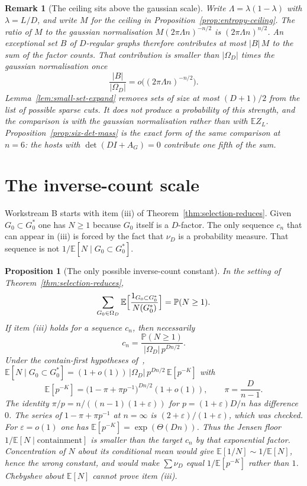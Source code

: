\documentclass[11pt]{article}
\newtheorem{proposition}[theorem]{Proposition}
\newtheorem{remark}[theorem]{Remark}
\newcommand{\EE}{\mathbb{E}}
\newcommand{\PP}{\mathbb{P}}
\begin{document}
\begin{remark}[The ceiling sits above the gaussian scale]
\label{rem:ceiling-gaussian}
Write \(\Lambda=\lambda(1-\lambda)\) with \(\lambda=L/D\), and write \(M\) for the
ceiling in Proposition~\ref{prop:entropy-ceiling}.
The ratio of \(M\) to the gaussian normalisation \(M(2\pi\Lambda n)^{-n/2}\) is
\((2\pi\Lambda n)^{n/2}\).
An exceptional set \(B\) of \(D\)-regular graphs therefore contributes at most
\(|B|\,M\) to the sum of the factor counts.
That contribution is smaller than \(|\Omega_D|\) times the gaussian
normalisation once
\[
\frac{|B|}{|\Omega_D|}
=
o\bigl((2\pi\Lambda n)^{-n/2}\bigr).
\]
Lemma~\ref{lem:small-set-expand} removes sets of size at most \((D+1)/2\) from
the list of possible sparse cuts.
It does not produce a probability of this strength, and the comparison is with
the gaussian normalisation rather than with \(\EE Z_L\).
Proposition~\ref{prop:six-det-mass} is the exact form of the same comparison
at \(n=6\): the hosts with \(\det(DI+A_G)=0\) contribute one fifth of the sum.
\end{remark}

\section{The inverse-count scale}
\label{sec:inverse-scale}

Workstream B starts with item (iii) of Theorem~\ref{thm:selection-reduces}.
Given \(G_0\subset G^*_0\) one has \(N\ge 1\) because \(G_0\) itself is a
\(D\)-factor.
The only sequence \(c_n\) that can appear in (iii) is forced by the fact
that \(\nu_D\) is a probability measure.
That sequence is not \(1/\EE[N\mid G_0\subset G^*_0]\).

\begin{proposition}[The only possible inverse-count constant]
\label{prop:target-cn}
In the setting of Theorem~\ref{thm:selection-reduces},
\[
\sum_{G_0\in\Omega_D}\EE\Bigl[\frac{1_{G_0\subset G^*_0}}{N(G^*_0)}\Bigr]
=
\PP(N\ge 1).
\]
If item (iii) holds for a sequence \(c_n\), then necessarily
\[
c_n
=
\frac{\PP(N\ge 1)}{\lvert\Omega_D\rvert\,p^{Dn/2}}.
\]
Under the contain-first hypotheses of~\cite{PlusOneV1},
\(\EE[N\mid G_0\subset G^*_0]=(1+o(1))\,\lvert\Omega_D\rvert\,p^{Dn/2}\,\EE[p^{-K}]\)
with
\[
\EE[p^{-K}]
=
\bigl(1-\pi+\pi p^{-1}\bigr)^{Dn/2}(1+o(1)),
\qquad
\pi=\frac{D}{n-1}.
\]
The identity \(\pi/p=n/((n-1)(1+\varepsilon))\) for \(p=(1+\varepsilon)D/n\)
has difference \(0\).
The series of \(1-\pi+\pi p^{-1}\) at \(n=\infty\) is
\((2+\varepsilon)/(1+\varepsilon)\), which was checked.
For \(\varepsilon=o(1)\) one has \(\EE[p^{-K}]=\exp(\Theta(Dn))\).
Thus the Jensen floor \(1/\EE[N\mid\text{containment}]\) is smaller than
the target \(c_n\) by that exponential factor.
Concentration of \(N\) about its conditional mean would give
\(\EE[1/N]\sim 1/\EE[N]\), hence the wrong constant, and would make
\(\sum\nu_D\) equal \(1/\EE[p^{-K}]\) rather than \(1\).
Chebyshev about \(\EE[N]\) cannot prove item (iii).
\end{proposition}
\end{document}
